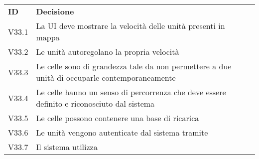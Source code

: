 \documentclass[]{article}
\begin{document}
	\begin{table} [h!]
		\begin{center}
			\begin{tabular} { m{2cm} m{14cm} }
				\rowcolor{lightgray}
				\textbf{ID} & \textbf{Decisione}\\
				V33.1 & La UI deve mostrare la velocità delle unità presenti in mappa \\
				V33.2 & Le unità autoregolano la propria velocità \\
				V33.3 & Le celle sono di grandezza tale da non permettere a due unità di occuparle contemporaneamente \\
				V33.4 & Le celle hanno un senso di percorrenza che deve essere definito e riconosciuto dal sistema \\
				V33.5 & Le celle possono contenere una base di ricarica \\
				V33.6 & Le unità vengono autenticate dal sistema tramite \glock{UUID} \\
				V33.7 & Il sistema utilizza \glock{wss}\\
			\end{tabular}
		\end{center}
	\end{table}
\end{document}
